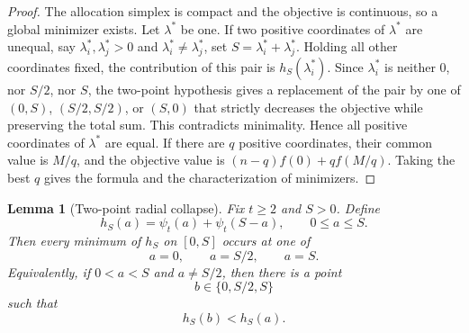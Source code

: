 \documentclass[11pt]{article}
\newtheorem{lemma}[theorem]{Lemma}
\theoremstyle{definition}
\theoremstyle{remark}
\newcommand{\1}{\mathbf 1}
\begin{document}
\begin{proof}
The allocation simplex is compact and the objective is continuous, so
a global minimizer exists.  Let $\lambda^*$ be one.  If two positive
coordinates of $\lambda^*$ are unequal, say $\lambda_i^*,\lambda_j^*>0$ and $\lambda_i^*\ne\lambda_j^*$, set $S=\lambda_i^*+\lambda_j^*$.  Holding all other coordinates fixed, the contribution of this pair is $h_S(\lambda_i^*)$.  Since $\lambda_i^*$ is neither $0$, nor $S/2$, nor $S$, the two-point hypothesis gives a replacement of the pair by one of $(0,S)$, $(S/2,S/2)$, or $(S,0)$ that strictly decreases the objective while preserving the total sum.  This contradicts minimality.  Hence all positive coordinates of $\lambda^*$ are equal.  If there are $q$ positive coordinates, their common value is $M/q$, and the objective value is $(n-q)f(0)+qf(M/q)$.  Taking the best $q$ gives the formula and the characterization of minimizers.
\end{proof}

\begin{lemma}[Two-point radial collapse]\label{lem:two-point-radial-collapse}
Fix \(t\ge2\) and \(S>0\).  Define
\[
  h_S(a)=\psi_t(a)+\psi_t(S-a),\qquad 0\le a\le S.
\]
Then every minimum of \(h_S\) on \([0,S]\) occurs at one of
\[
  a=0,\qquad a=S/2,\qquad a=S.
\]
Equivalently, if \(0<a<S\) and \(a\ne S/2\), then there is a point
\[
  b\in\{0,S/2,S\}
\]
such that
\[
  h_S(b)<h_S(a).
\]
\end{lemma}
\end{document}
